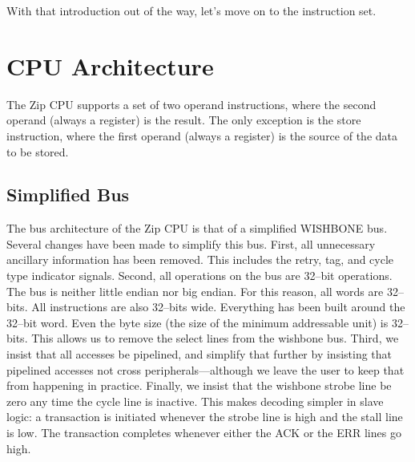 \documentclass{gqtekspec}
\begin{document}
With that introduction out of the way, let's move on to the instruction
set.

\chapter{CPU Architecture}\label{chap:arch}

The Zip CPU supports a set of two operand instructions, where the second operand
(always a register) is the result.  The only exception is the store instruction,
where the first operand (always a register) is the source of the data to be
stored.

\section{Simplified Bus}
The bus architecture of the Zip CPU is that of a simplified WISHBONE bus.
Several changes have been made to simplify this bus.  First, all unnecessary
ancillary information has been removed.  This includes the retry, tag, and
cycle type indicator signals.  Second, all operations on the bus are 32--bit
operations.  The bus is neither little endian nor big endian.  For this
reason, all words are 32--bits.  All instructions are also 32--bits wide. 
Everything has been built around the 32--bit word.  Even the byte size
(the size of the minimum addressable unit) is 32--bits.  This allows us to
remove the select lines from the wishbone bus.  Third, we insist that all
accesses be pipelined, and simplify that further by insisting that pipelined
accesses not cross peripherals---although we leave the user to keep that
from happening in practice.  Finally, we insist that the wishbone strobe line
be zero any time the cycle line is inactive.  This makes decoding simpler
in slave logic: a transaction is initiated whenever the strobe line is high
and the stall line is low.  The transaction completes whenever either the
ACK or the ERR lines go high.
\end{document}
